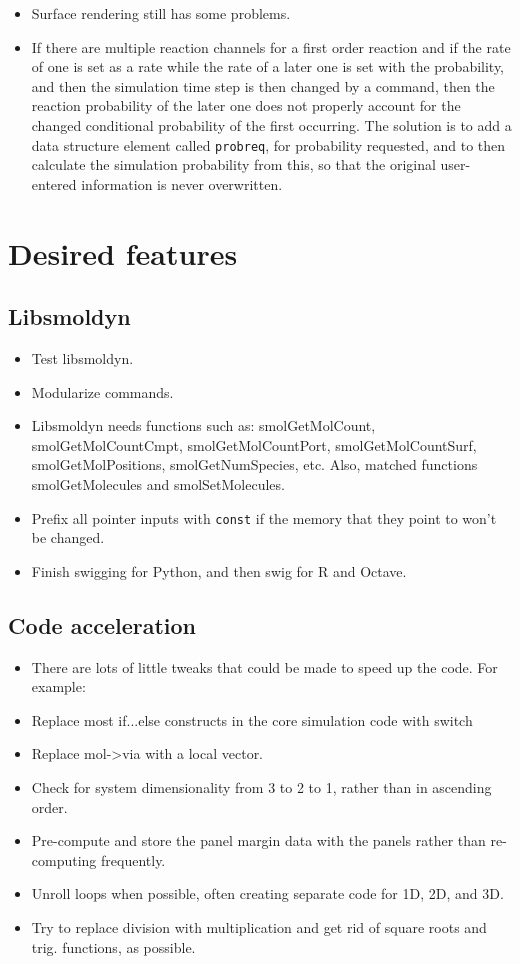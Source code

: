 \documentclass {scrbook}
\newcommand {\ttt} {\texttt}
\begin{document}
\begin{itemize}
\item Surface rendering still has some problems.
\item If there are multiple reaction channels for a first order reaction and if the rate of one is set as a rate while the rate of a later one is set with the probability, and then the simulation time step is then changed by a command, then the reaction probability of the later one does not properly account for the changed conditional probability of the first occurring. The solution is to add a data structure element called \ttt{probreq}, for probability requested, and to then calculate the simulation probability from this, so that the original user-entered information is never overwritten.
\end{itemize}

\section{Desired features}

\subsection*{Libsmoldyn}
\begin{itemize}
\item Test libsmoldyn.
\item Modularize commands.
\item Libsmoldyn needs functions such as: smolGetMolCount, smolGetMolCountCmpt, smolGetMolCountPort, smolGetMolCountSurf, smolGetMolPositions, smolGetNumSpecies, etc. Also, matched functions smolGetMolecules and smolSetMolecules.
\item Prefix all pointer inputs with \ttt{const} if the memory that they point to won't be changed.
\item Finish swigging for Python, and then swig for R and Octave.
\end{itemize}

\subsection*{Code acceleration}
\begin{itemize}
\item There are lots of little tweaks that could be made to speed up the code. For example:
\item Replace most if...else constructs in the core simulation code with switch
\item Replace mol->via with a local vector.
\item Check for system dimensionality from 3 to 2 to 1, rather than in ascending order.
\item Pre-compute and store the panel margin data with the panels rather than re-computing frequently.
\item Unroll loops when possible, often creating separate code for 1D, 2D, and 3D.
\item Try to replace division with multiplication and get rid of square roots and trig. functions, as possible.
\end{itemize}
\end{document}
